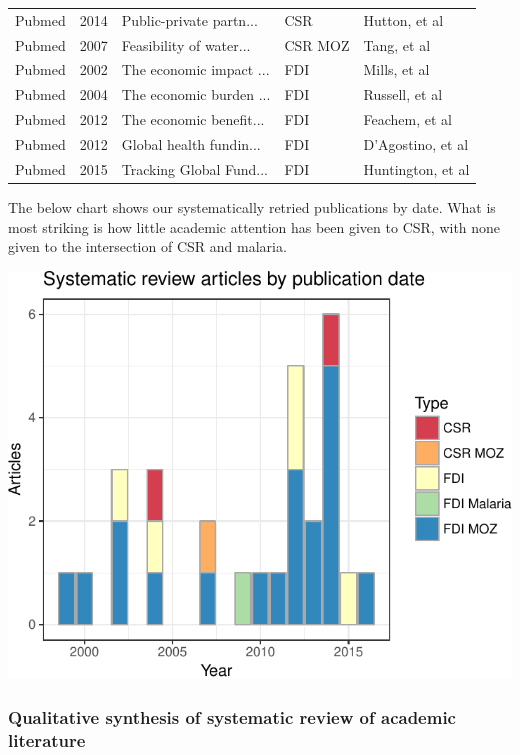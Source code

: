 \documentclass[]{article}
\begin{document}
\begin{longtable}{lllll}
  Pubmed & 2014 & Public-private partn... & CSR & Hutton, et al \\ 
  Pubmed & 2007 & Feasibility of water... & CSR MOZ & Tang, et al \\ 
  Pubmed & 2002 & The economic impact ... & FDI & Mills, et al \\ 
  Pubmed & 2004 & The economic burden ... & FDI & Russell, et al \\ 
  Pubmed & 2012 & The economic benefit... & FDI & Feachem, et al \\ 
  Pubmed & 2012 & Global health fundin... & FDI & D'Agostino, et al \\ 
  Pubmed & 2015 & Tracking Global Fund... & FDI & Huntington, et al \\ 
   \hline
\hline
\end{longtable}

\endgroup

The below chart shows our systematically retried publications by date.
What is most striking is how little academic attention has been given to
CSR, with none given to the intersection of CSR and malaria.

\begin{center}\includegraphics{figures/unnamed-chunk-19-1} \end{center}

\subsubsection{Qualitative synthesis of systematic review of academic
literature}\label{qualitative-synthesis-of-systematic-review-of-academic-literature}
\end{document}
